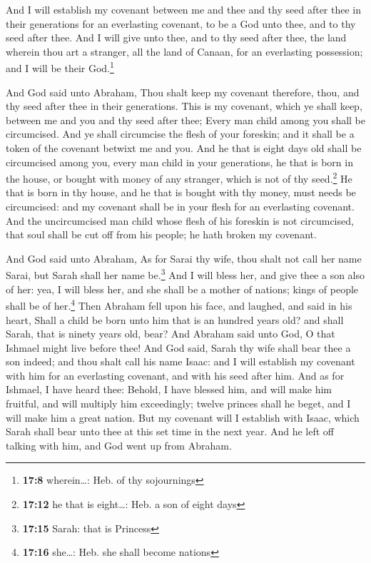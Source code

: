  And I will establish my covenant between me and thee and
thy seed after thee in their generations for an everlasting covenant, to
be a God unto thee, and to thy seed after thee.  And I
will give unto thee, and to thy seed after thee, the land wherein thou
art a stranger, all the land of Canaan, for an everlasting possession;
and I will be their God.\footnote{\textbf{17:8} wherein\ldots: Heb. of
  thy sojournings}

 And God said unto Abraham, Thou shalt keep my covenant
therefore, thou, and thy seed after thee in their generations.
 This is my covenant, which ye shall keep, between me and
you and thy seed after thee; Every man child among you shall be
circumcised.  And ye shall circumcise the flesh of your
foreskin; and it shall be a token of the covenant betwixt me and you.
 And he that is eight days old shall be circumcised among
you, every man child in your generations, he that is born in the house,
or bought with money of any stranger, which is not of thy
seed.\footnote{\textbf{17:12} he that is eight\ldots: Heb. a son of
  eight days}  He that is born in thy house, and he that
is bought with thy money, must needs be circumcised: and my covenant
shall be in your flesh for an everlasting covenant.  And
the uncircumcised man child whose flesh of his foreskin is not
circumcised, that soul shall be cut off from his people; he hath broken
my covenant.

 And God said unto Abraham, As for Sarai thy wife, thou
shalt not call her name Sarai, but Sarah shall her name be.\footnote{\textbf{17:15}
  Sarah: that is Princess}  And I will bless her, and
give thee a son also of her: yea, I will bless her, and she shall be a
mother of nations; kings of people shall be of her.\footnote{\textbf{17:16}
  she\ldots: Heb. she shall become nations}  Then Abraham
fell upon his face, and laughed, and said in his heart, Shall a child be
born unto him that is an hundred years old? and shall Sarah, that is
ninety years old, bear?  And Abraham said unto God, O
that Ishmael might live before thee!  And God said, Sarah
thy wife shall bear thee a son indeed; and thou shalt call his name
Isaac: and I will establish my covenant with him for an everlasting
covenant, and with his seed after him.  And as for
Ishmael, I have heard thee: Behold, I have blessed him, and will make
him fruitful, and will multiply him exceedingly; twelve princes shall he
beget, and I will make him a great nation.  But my
covenant will I establish with Isaac, which Sarah shall bear unto thee
at this set time in the next year.  And he left off
talking with him, and God went up from Abraham.

